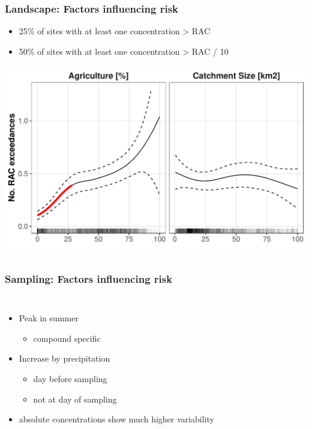\documentclass[
	10pt
	]{beamer}
\begin{document}
\begin{frame}
\frametitle{Landscape: Factors influencing risk}
	\begin{itemize}
		\item 25\% of sites with at least one concentration > RAC
		\item 50\% of sites with at least one concentration > RAC / 10
	\end{itemize}
	\includegraphics[width = 1\textwidth]{figs/agri_size_eff.pdf}
\end{frame}

\begin{frame}
\frametitle{Sampling: Factors influencing risk}
	\begin{columns}
			\resizebox{1.1\textwidth}{!}{%
				}
	    	\begin{itemize}
	    		\item Peak in summer
	    			\begin{itemize}
	    			    \item compound specific
	    			\end{itemize}
	    		\item Increase by \alert{precipitation}
			    	\begin{itemize}		
			    		\item day before sampling
			    		\item not at day of sampling
			    	\end{itemize}	
	    		\item absolute concentrations show much higher variability
	    	\end{itemize}
	\end{columns}
\end{frame}
\end{document}
